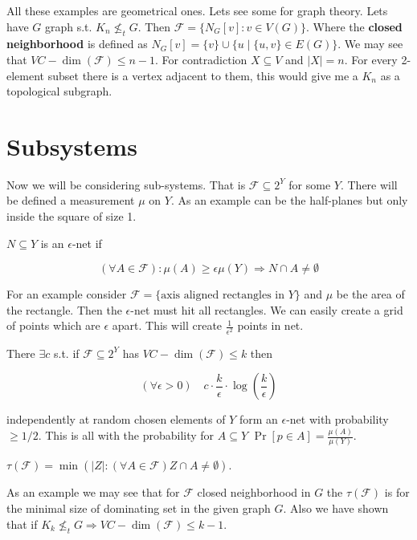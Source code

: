 All these examples are geometrical ones. Lets see some for graph theory. Lets have $G$ graph s.t. $K_{n} \nleq_{t} G$. Then $\mathcal{F} = \{N_{G}[v] : v \in V(G)\}$. Where the \textbf{closed neighborhood} is defined as $N_{G}[v] = \{v\} \cup \{u \mid \{u,v\} \in E(G)\}$. We may see that $VC-\dim(\mathcal{F}) \leq n-1$. For contradiction $X \subseteq V$ and $|X| = n$. For every 2-element subset there is a vertex adjacent to them, this would give me a $K_{n}$ as a topological subgraph.

\section{Subsystems}

Now we will be considering sub-systems. That is $\mathcal{F} \subseteq 2^{Y}$ for some $Y$. There will be defined a measurement $\mu$ on $Y$. As an example can be the half-planes but only inside the square of size 1.

\begin{defn}
	$N \subseteq Y$ is an $\epsilon$-net if
	
	$$
	(\forall A \in \mathcal{F}) : \mu(A) \geq \epsilon \mu(Y) \Rightarrow N \cap A \neq \emptyset
	$$
\end{defn}

For an example consider $\mathcal{F} = \{\text{axis aligned rectangles in }Y\}$ and $\mu$ be the area of the rectangle. Then the $\epsilon$-net must hit all rectangles. We can easily create a grid of points which are $\epsilon$ apart. This will create $\frac{1}{\epsilon^2}$ points in net.

\begin{thm}
	There $\exists c$ s.t. if $\mathcal{F} \subseteq 2^Y$ has $VC-\dim(\mathcal{F}) \leq k$ then
	
	$$
	(\forall \epsilon > 0) \quad c \cdot \frac{k}{\epsilon} \cdot \log \left( \frac{k}{\epsilon} \right)
	$$
	
	independently at random chosen elements of $Y$ form an $\epsilon$-net with probability $\geq 1/2$. This is all with the probability for $A \subseteq Y$ $\Pr [p \in A] = \frac{\mu(A)}{\mu(Y)}$.
\end{thm}

\begin{defn}
	$\tau (\mathcal{F}) = \min \left( |Z| : (\forall A \in \mathcal{F}) Z \cap A \neq \emptyset \right)$.
\end{defn}

As an example we may see that for $\mathcal{F}$ closed neighborhood in $G$ the $\tau(\mathcal{F})$ is for the minimal size of dominating set in the given graph $G$. Also we have shown that if $K_{k} \nleq_{t} G \Rightarrow VC-\dim(\mathcal{F}) \leq k - 1$.

